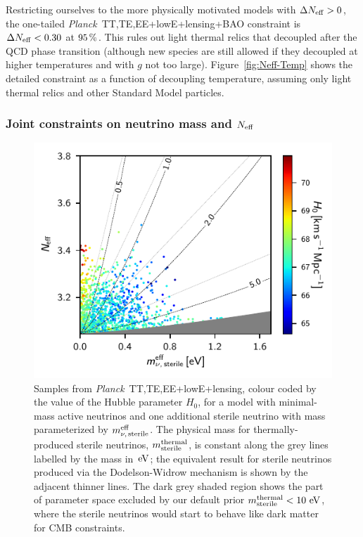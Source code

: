 \documentclass[longauth,traditabstract]{aa}
\def\Planck{\textit{Planck}}
\def\,{\thinspace}
\newcommand{\mksym}[1]{\ifmmode {\rm #1}\else #1\fi}
\newcommand{\dataplus}{\allowbreak+}
\newcommand{\TTTEEE}{\mksym{TT,TE,EE}}
\newcommand{\planckTTTEEEonly}{\planck\ \TTTEEE}
\newcommand{\lowE}{\mksym{lowE}}
\newcommand{\planckall}{\planckTTTEEEonly\dataplus\lowE}
\newcommand{\nnu}{N_{\rm eff}}
\newcommand{\mnusterile}{m_{\nu,\, \mathrm{sterile}}^{\mathrm{eff}}}
\newcommand{\meffsterile}{\mnusterile}
\newcommand{\msthermal}{m_{\rm sterile}^{\rm thermal}}
\providecommand{\text}[1]{\rm{#1}}
\newcommand{\eV}{\,\text{eV}}
\newcommand{\planck}{\Planck}
\begin{document}
Restricting ourselves to the more physically motivated models with $\Delta\nnu>0$, the one-tailed \planckall+lensing+BAO constraint is $\Delta \nnu < 0.30$ at $95\,\%$.  This rules out light thermal relics that
decoupled after the QCD phase transition (although new species are still allowed if they decoupled at higher temperatures and with $g$ not too large).
Figure~\ref{fig:Neff-Temp} shows the detailed constraint as a function of decoupling temperature, assuming only light thermal relics and other Standard Model particles.

\subsubsection{Joint constraints on neutrino mass and $\nnu$}

\begin{figure}[t]
\centering
\includegraphics[]{meffsterile_nnu.pdf}
\caption{Samples from \planckall+lensing, colour coded by the value of the Hubble parameter $H_0$,
for a model with minimal-mass active neutrinos and one additional sterile neutrino with mass parameterized by $\meffsterile$.
The physical mass for thermally-produced sterile neutrinos, $\msthermal$, is constant along the grey lines labelled by the mass in $\eV$;
the equivalent result for sterile neutrinos produced via the Dodelson-Widrow mechanism \citep{Dodelson:1993je} is shown by the adjacent thinner lines.
The dark grey shaded region shows the part of parameter space excluded by our default prior $\msthermal <10\,\eV$, where the
sterile neutrinos would start to behave like dark matter for CMB constraints.
\label{fig:meffsterile}
}
\end{figure}
\end{document}
